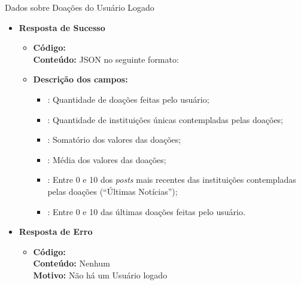 \begin{caixa}{Dados sobre Doações do Usuário Logado}{}
\begin{itemize}
\item \textbf{Resposta de Sucesso}
	\begin{itemize}
		\item \textbf{Código:}  \\ \textbf{Conteúdo:} JSON no seguinte formato: 
        \item \textbf{Descrição dos campos:}
          \begin{itemize}
	        \item {}: Quantidade de doações feitas pelo usuário;
            \item {}: Quantidade de instituições únicas contempladas pelas doações;
            \item {}: Somatório dos valores das doações;
            \item {}: Média dos valores das doações;
            \item {}: Entre 0 e 10 dos \emph{posts} mais recentes das instituições contempladas pelas doações (``Últimas Notícias'');
            \item {}: Entre 0 e 10 das últimas doações feitas pelo usuário.
          \end{itemize}
	\end{itemize}

\item \textbf{Resposta de Erro}
	\begin{itemize}
		\item \textbf{Código:}  \\ \textbf{Conteúdo:} Nenhum \\ \textbf{Motivo:} Não há um Usuário logado
	\end{itemize}

\end{itemize}
\end{caixa}


